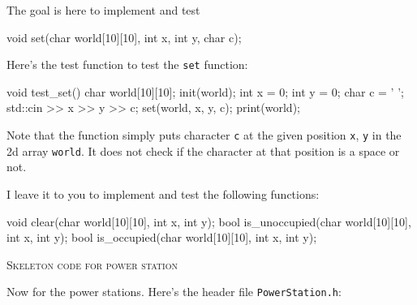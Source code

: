 The goal is here to implement and test
\begin{console}
void set(char world[10][10], int x, int y, char c);
\end{console}

Here's the test function to test the \verb!set! function:
\begin{console}
void test_set()
{
    char world[10][10];
    init(world);
    int x = 0;
    int y = 0;
    char c = ' ';
    std::cin >> x >> y >> c;
    set(world, x, y, c);
    print(world);
}
\end{console}
Note that the function simply puts character \verb!c! at the given position
\verb!x!, \verb!y! in the 2d array \verb!world!.
It does not check if the character at that position is a space or not.

I leave it to you to implement and test the following functions:
\begin{console}[commandchars=\\\{\}]
void clear(char world[10][10], int x, int y);
bool is_unoccupied(char world[10][10], int x, int y);
bool is_occupied(char world[10][10], int x, int y);
\end{console}


  
\newpage
\textsc{Skeleton code for power station}

Now for the power stations.
Here's the header file \verb!PowerStation.h!:
